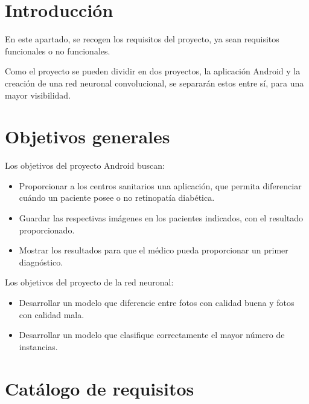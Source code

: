 
\section{Introducción}

En este apartado, se recogen los requisitos del proyecto, ya sean requisitos funcionales o no funcionales.

Como el proyecto se pueden dividir en dos proyectos, la aplicación Android y la creación de una red neuronal convolucional, se separarán estos entre sí, para una mayor visibilidad.

\section{Objetivos generales}

Los objetivos del proyecto Android buscan:

\begin{itemize}
    \item Proporcionar a los centros sanitarios una aplicación, que permita diferenciar cuándo un paciente posee o no retinopatía diabética.
    \item Guardar las respectivas imágenes en los pacientes indicados, con el resultado proporcionado.
    \item Mostrar los resultados para que el médico pueda proporcionar un primer diagnóstico.
\end{itemize}

Los objetivos del proyecto de la red neuronal:

\begin{itemize}
    \item Desarrollar un modelo que diferencie entre fotos con calidad buena y fotos con calidad mala.
    \item Desarrollar un modelo que clasifique correctamente el mayor número de instancias.
\end{itemize}

\section{Catálogo de requisitos}


